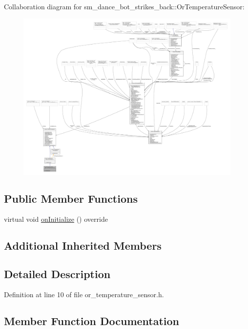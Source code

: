 Collaboration diagram for sm\+\_\+dance\+\_\+bot\+\_\+strikes\+\_\+back\+:\+:Or\+Temperature\+Sensor\+:
\nopagebreak
\begin{figure}[H]
\begin{center}
\leavevmode
\includegraphics[width=350pt]{classsm__dance__bot__strikes__back_1_1OrTemperatureSensor__coll__graph}
\end{center}
\end{figure}
\subsection*{Public Member Functions}
\begin{DoxyCompactItemize}
\item 
virtual void \hyperlink{classsm__dance__bot__strikes__back_1_1OrTemperatureSensor_a5ad96122dd84bf27e0a1f5c7c87be7e2}{on\+Initialize} () override
\end{DoxyCompactItemize}
\subsection*{Additional Inherited Members}


\subsection{Detailed Description}


Definition at line 10 of file or\+\_\+temperature\+\_\+sensor.\+h.



\subsection{Member Function Documentation}
\mbox{\label{classsm__dance__bot__strikes__back_1_1OrTemperatureSensor_a5ad96122dd84bf27e0a1f5c7c87be7e2}} 
